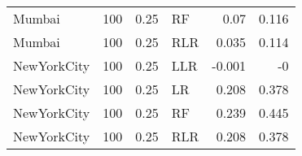 \begin{tabular}{lrrlrr}
 Mumbai      &              100 &    0.25 & RF      &  0.07  &  0.116 \\
 Mumbai      &              100 &    0.25 & RLR     &  0.035 &  0.114 \\
 NewYorkCity &              100 &    0.25 & LLR     & -0.001 & -0     \\
 NewYorkCity &              100 &    0.25 & LR      &  0.208 &  0.378 \\
 NewYorkCity &              100 &    0.25 & RF      &  0.239 &  0.445 \\
 NewYorkCity &              100 &    0.25 & RLR     &  0.208 &  0.378 \\
\bottomrule
\end{tabular}